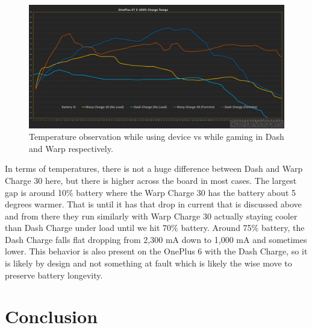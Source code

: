 \documentclass[conference]{IEEEtran}
\begin{document}
\begin{figure}[h!]
  \includegraphics[width=\linewidth]{images/image16.png}
  \caption{ Temperature observation while using device vs while gaming in Dash and Warp respectively.\cite{b18}}
\end{figure}

In terms of temperatures, there is not a huge difference between Dash and Warp Charge 30 here, but there is higher across the board in most cases. The largest gap is around 10\% battery where the Warp Charge 30 has the battery about 5 degrees warmer. That is until it has that drop in current that is discussed above and from there they run similarly with Warp Charge 30 actually staying cooler than Dash Charge under load until we hit 70\% battery. Around 75\% battery, the Dash Charge falls flat dropping from 2,300 mA down to 1,000 mA and sometimes lower. This behavior is also present on the OnePlus 6 with the Dash Charge, so it is likely by design and not something at fault which is likely the wise move to preserve battery longevity\cite{b18}.


\section{Conclusion}
\end{document}
